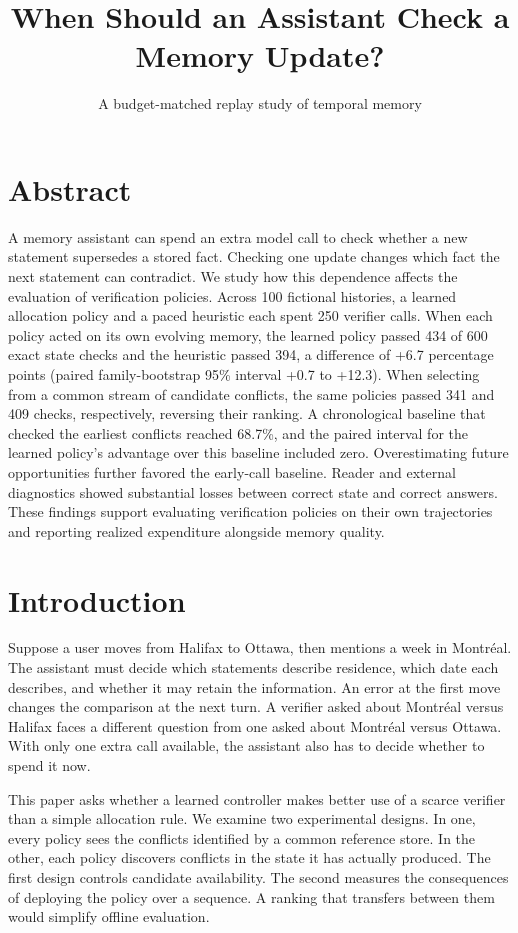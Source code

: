 \documentclass[
  11pt,
]{article}
\title{When Should an Assistant Check a Memory Update?}
\subtitle{A budget-matched replay study of temporal memory}
\author{}
\date{}
\begin{document}
\maketitle

\section{Abstract}\label{abstract}

A memory assistant can spend an extra model call to check whether a new
statement supersedes a stored fact. Checking one update changes which
fact the next statement can contradict. We study how this dependence
affects the evaluation of verification policies. Across 100 fictional
histories, a learned allocation policy and a paced heuristic each spent
250 verifier calls. When each policy acted on its own evolving memory,
the learned policy passed 434 of 600 exact state checks and the
heuristic passed 394, a difference of +6.7 percentage points (paired
family-bootstrap 95\% interval +0.7 to +12.3). When selecting from a
common stream of candidate conflicts, the same policies passed 341 and
409 checks, respectively, reversing their ranking. A chronological
baseline that checked the earliest conflicts reached 68.7\%, and the
paired interval for the learned policy's advantage over this baseline
included zero. Overestimating future opportunities further favored the
early-call baseline. Reader and external diagnostics showed substantial
losses between correct state and correct answers. These findings support
evaluating verification policies on their own trajectories and reporting
realized expenditure alongside memory quality.

\section{Introduction}\label{introduction}

Suppose a user moves from Halifax to Ottawa, then mentions a week in
Montréal. The assistant must decide which statements describe residence,
which date each describes, and whether it may retain the information. An
error at the first move changes the comparison at the next turn. A
verifier asked about Montréal versus Halifax faces a different question
from one asked about Montréal versus Ottawa. With only one extra call
available, the assistant also has to decide whether to spend it now.

This paper asks whether a learned controller makes better use of a
scarce verifier than a simple allocation rule. We examine two
experimental designs. In one, every policy sees the conflicts identified
by a common reference store. In the other, each policy discovers
conflicts in the state it has actually produced. The first design
controls candidate availability. The second measures the consequences of
deploying the policy over a sequence. A ranking that transfers between
them would simplify offline evaluation.
\end{document}
